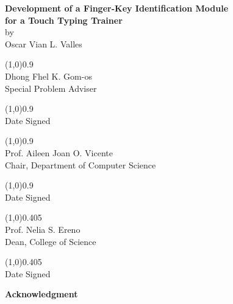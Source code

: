 \documentclass{report}
\begin{document}
\begin{center}
	\textbf{Development of a Finger-Key Identification Module\\for a Touch Typing Trainer}\\
	by\\
	Oscar Vian L. Valles

	\par\vspace{0.5cm}

	\begin{minipage}[t]{0.45\textwidth}
		\centering
		\line(1,0){0.9\textwidth}\\
		Dhong Fhel K. Gom-os\\
		Special Problem Adviser

		\par\vspace{0.5cm}
		\line(1,0){0.9\textwidth}\\
		Date Signed
	\end{minipage}
	\begin{minipage}[t]{0.45\textwidth}
		\centering
		\line(1,0){0.9\textwidth}\\
		Prof. Aileen Joan O. Vicente\\
		Chair, Department of Computer Science

		\par\vspace{0.5cm}
		\line(1,0){0.9\textwidth}\\
		Date Signed
	\end{minipage}

	\par\vspace{2cm}

	\line(1,0){0.405\textwidth}\\
	Prof. Nelia S. Ereno\\
	Dean, College of Science

	\par\vspace{0.5cm}
	\line(1,0){0.405\textwidth}\\
	Date Signed

	\par\vspace{2cm}
\end{center}

\newpage


\begin{center}
	\LARGE\textbf{Acknowledgment}
\end{center}
\end{document}
